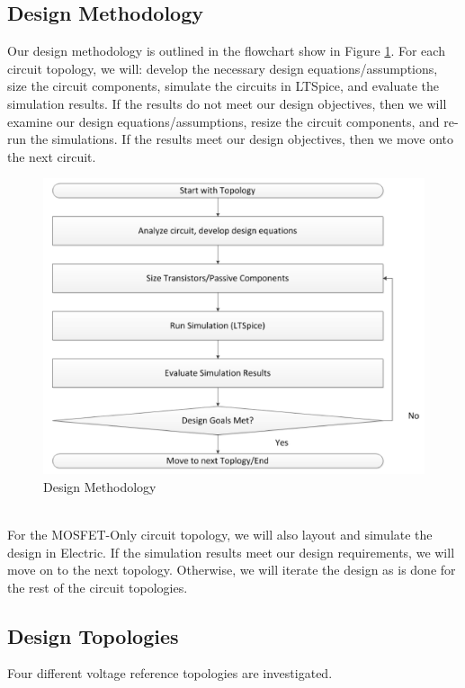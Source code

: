 \documentclass[conference]{IEEEtran}
\newcommand{\tab}{\hspace*{2em}}
\begin{document}
\subsection{Design Methodology}
Our design methodology is outlined in the flowchart show in Figure \ref{fig:design-methodology}.  For each circuit topology, we will: develop the necessary design equations/assumptions, size the circuit components, simulate the circuits in LTSpice, and evaluate the simulation results.  If the results do not meet our design objectives, then we will examine our design equations/assumptions, resize the circuit components, and re-run the simulations.  If the results meet our design objectives, then we move onto the next circuit.
\begin{figure}[!htbp]
  \centering
  \includegraphics[scale=0.45]{images/design-methodology.png}
  \caption[design-methodology]{Design Methodology}
  \label{fig:design-methodology}
\end{figure}
\\\tab
For the MOSFET-Only circuit topology, we will also layout and simulate the design in Electric.  If the simulation results meet our design requirements, we will move on to the next topology.  Otherwise, we will iterate the design as is done for the rest of the circuit topologies.\\

\subsection{Design Topologies}
Four different voltage reference topologies are investigated.
\end{document}
